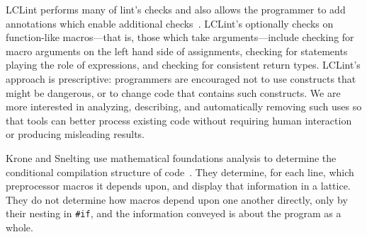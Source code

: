 \documentclass[11pt]{article}
\begin{document}
LCLint performs many of lint's checks and also
allows the programmer to add annotations which enable additional
checks~\cite{Evans-pldi96,Evans-fse94}.
LCLint's  optionally checks  on function-like
macros---that is, those which take arguments---include checking for
macro arguments on the left hand side of assignments, checking for statements
playing the role of expressions, and checking for consistent return types.
LCLint's approach is prescriptive: programmers are encouraged not to use
constructs that might be dangerous, or to change code that contains such
constructs.  We are more interested in analyzing, describing, and
automatically removing such uses so that tools can better process existing
code without requiring human interaction or producing misleading results.


Krone and Snelting use mathematical foundations analysis to determine the
conditional compilation structure of code~\cite{Krone94}.  They determine,
for each line, which preprocessor macros it depends upon, and display that
information in a lattice.  They do not determine how macros depend upon one
another directly, only by their nesting in {\tt \#if}, and the information
conveyed is about the program as a whole.
\end{document}
